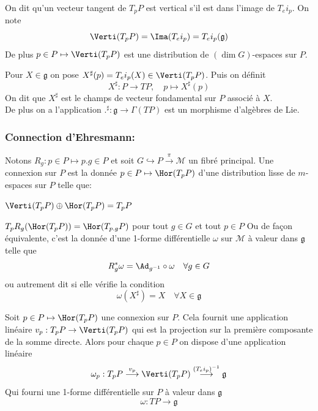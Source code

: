 \begin{defi}
On dit qu'un vecteur tangent de $T_pP$ est vertical s'il est dans l'image de $T_e i_p$. On note 
$$\Verti(T_pP) = \Ima(T_e i_p) = T_e i_p(\mathfrak{g})$$
De plus $p\in P \mapsto \Verti(T_pP)$ est une distribution de $(\dim G)$-espaces sur $P$. 
\end{defi}

\begin{defi}
Pour $X\in \mathfrak{g}$ on pose $X^\sharp(p) = T_e i_p(X) \in \Verti(T_pP)$. Puis on définit 
$$X^\sharp: P \to TP, \quad p \mapsto X^\sharp(p)$$
On dit que $X^\sharp$ est le champs de vecteur fondamental sur $P$ associé à $X$. \\
De plus on a l'application $.^\sharp : \mathfrak{g} \to \Gamma(TP)$ est un morphisme d'algèbres de Lie.
\end{defi}

\subsubsection{Connection d'Ehresmann:}

\begin{defi}
Notons $R_g : p\in P \mapsto p.g \in P$ et soit $G \hookrightarrow P \overset{\pi}{\to} \mathcal{M}$ un fibré principal. Une connexion sur $P$ est la donnée $p\in P \mapsto \Hor(T_pP)$ d'une distribution lisse de $m$-espaces sur $P$ telle que:
\be
	\item $\Verti(T_pP) \oplus \Hor(T_pP) = T_pP$
	\item $T_pR_g(\Hor(T_pP)) = \Hor(T_{p.g}P)$ pour tout $g\in G$ et tout $p\in P$
\ee 
Ou de façon équivalente, c'est la donnée d'une 1-forme différentielle $\omega$ sur $\mathcal{M}$ à valeur dans $\mathfrak{g}$ telle que
$$R_g^*\omega  = \Ad_{g^{-1}} \circ \omega \quad \forall g\in G$$
ou autrement dit si elle vérifie la condition 
$$\omega(X^\sharp) = X \quad \forall X \in \mathfrak{g}$$
\end{defi}
\begin{preu}
Soit $p \in P \mapsto \Hor(T_pP)$ une connexion sur $P$. Cela fournit une application linéaire $v_p : T_pP \to \Verti(T_pP)$ qui est la projection sur la première composante de la somme directe. Alors pour chaque $p\in P$ on dispose d'une application linéaire 
$$\omega_p : T_pP \overset{v_p}{\longrightarrow} \Verti(T_pP) \overset{(T_e i_p)^{-1}}{\longrightarrow} \mathfrak{g}$$
Qui fourni une 1-forme différentielle sur $P$ à valeur dans $\mathfrak{g}$
$$\omega : TP \to \mathfrak{g}$$
\end{preu}


